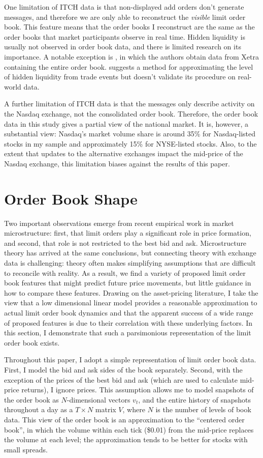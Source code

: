 	One limitation of ITCH data is that non-displayed add orders don't generate messages, and therefore we are only able to reconstruct the \textit{visible} limit order book. This feature means that the order books I reconstruct are the same as the order books that market participants observe in real time. Hidden liquidity is usually not observed in order book data, and there is limited research on its importance. A notable exception is \citet{Beltran-Lopez2009}, in which the authors obtain data from Xetra containing the entire order book. \citet{Avellaneda2011} suggests a method for approximating the level of hidden liquidity from trade events but doesn't validate its procedure on real-world data.

	A further limitation of ITCH data is that the messages only describe activity on the Nasdaq exchange, not the consolidated order book. Therefore, the order book data in this study gives a partial view of the national market. It is, however, a substantial view: Nasdaq's market volume share is around 35\% for Nasdaq-listed stocks in my sample and approximately 15\% for NYSE-listed stocks. Also, to the extent that updates to the alternative exchanges impact the mid-price of the Nasdaq exchange, this limitation biases against the results of this paper.


\section{Order Book Shape}
	Two important observations emerge from recent empirical work in market microstructure: first, that limit orders play a significant role in price formation, and second, that role is not restricted to the best bid and ask. Microstructure theory has arrived at the same conclusions, but connecting theory with exchange data is challenging: theory often makes simplifying assumptions that are difficult to reconcile with reality. As a result, we find a variety of proposed limit order book features that might predict future price movements, but little guidance in how to compare these features. Drawing on the asset-pricing literature, I take the view that a low dimensional linear model provides a reasonable approximation to actual limit order book dynamics and that the apparent success of a wide range of proposed features is due to their correlation with these underlying factors. In this section, I demonstrate that such a parsimonious representation of the limit order book exists.

	Throughout this paper, I adopt a simple representation of limit order book data. First, I model the bid and ask sides of the book separately. Second, with the exception of the prices of the best bid and ask (which are used to calculate mid-price returns), I ignore prices. This assumption allows me to model snapshots of the order book as $N$-dimensional vectors $v_t$, and the entire history of snapshots throughout a day as a $T \times N$ matrix $V$, where $N$ is the number of levels of book data. This view of the order book is an approximation to the ``centered order book'', in which the volume within each tick (\$0.01) from the mid-price replaces the volume at each level; the approximation tends to be better for stocks with small spreads.

